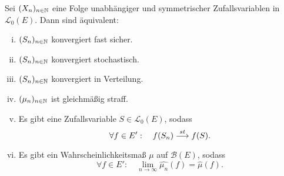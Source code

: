 \begin{theorem}
    Sei $(X_n)_{n \in \mathbb{N}}$ eine Folge unabhängiger und symmetrischer Zufallsvariablen in $\mathcal{L}_0(E)$. Dann sind äquivalent:
    \begin{enumerate}[(i)]
        \item $(S_n)_{n \in \mathbb{N}}$ konvergiert fast sicher.
        \item $(S_n)_{n \in \mathbb{N}}$ konvergiert stochastisch. 
        \item $(S_n)_{n \in \mathbb{N}}$ konvergiert in Verteilung. 
        \item $(\mu_n)_{n \in \mathbb{N}}$ ist gleichmäßig straff.
        \item Es gibt eine Zufallsvariable $S \in \mathcal{L}_0(E)$, sodass 
        $$
            \forall f \in E': \quad f(S_n) \overset{st}{\longrightarrow} f(S).
        $$
        \item Es gibt ein Wahrscheinlichkeitsmaß $\mu$ auf $\mathcal{B}(E)$, sodass 
        $$
            \forall f \in E': \quad \lim_{n \to \infty}\widehat{\mu_n}(f) = \widehat{\mu}(f). 
        $$
    \end{enumerate}
\end{theorem}

